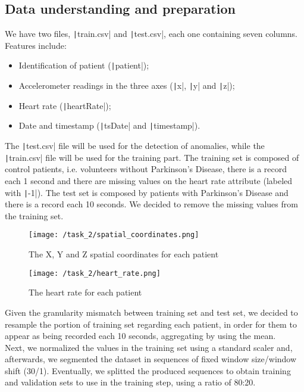 \documentclass[12pt,a4paper,leqno]{article}
\begin{document}
	\subsection{Data understanding and preparation}
	We have two files, \texttt|train.csv| and \texttt|test.csv|, each one containing seven columns. Features include:
	\begin{itemize}
		\item Identification of patient (\texttt|patient|);
		\item Accelerometer readings in the three axes (\texttt|x|, \texttt|y| and \texttt|z|);
		\item Heart rate (\texttt|heartRate|);
		\item Date and timestamp (\texttt|tsDate| and \texttt|timestamp|).
	\end{itemize}
	The \texttt|test.csv| file will be used for the detection of anomalies, while the \texttt|train.csv| file will be used for the training part. The training set is composed of control patients, i.e. volunteers without Parkinson’s Disease, there is a record each 1 second and there are missing values on the heart rate attribute (labeled with \texttt|-1|). The test set is composed by patients with Parkinson’s Disease and there is a record each 10 seconds. We decided to remove the missing values from the training set.
	\begin{figure}
		\centering
		\texttt{[image: /task\_2/spatial\_coordinates.png]}
		\caption{The X, Y and Z spatial coordinates for each patient}
		\label{task_2/spatial_coordinates}
	\end{figure}
	\begin{figure}
		\centering
		\texttt{[image: /task\_2/heart\_rate.png]}
		\caption{The heart rate for each patient}
		\label{task_2/heart_rate}
	\end{figure}
	Given the granularity mismatch between training set and test set, we decided to resample the portion of training set regarding each patient, in order for them to appear as being recorded each 10 seconds, aggregating by using the mean.\\
	Next, we normalized the values in the training set using a standard scaler and, afterwards, we segmented the dataset in sequences of fixed window size/window shift (30/1). Eventually, we splitted the produced sequences to obtain training and validation sets to use in the training step, using a ratio of 80:20.
	
\end{document}
